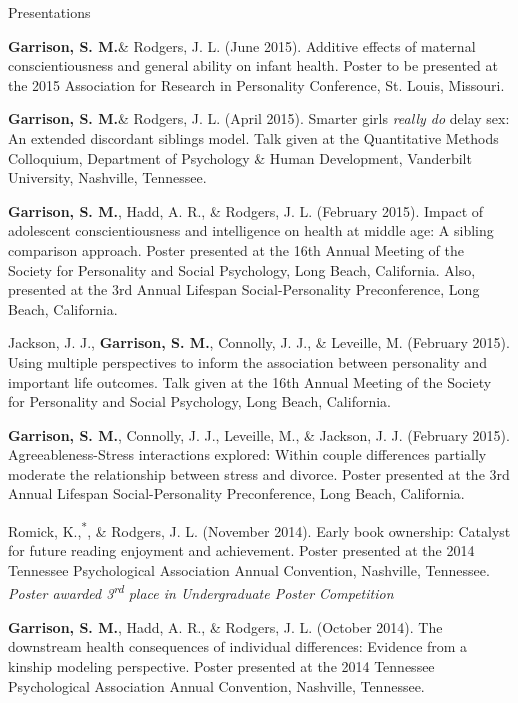 \documentclass {resume}
\newcommand{\meb}{{\bf Garrison, S. M.}\xspace}
\newcommand{\student}{\hspace{-3.95pt}\textsuperscript{*}\hspace* {2 pt}}
\newlength{\wideitemsep}
\let\olditem\item
\renewcommand{\item}{\setlength{\itemsep}{\wideitemsep}\olditem}
\begin{document}
\begin{rSection}{\textrm{Presentations}}\begin{etaremune}
\item \meb \& Rodgers, J. L. (June 2015). Additive effects of maternal conscientiousness and general ability on infant health. Poster to be presented at the 2015 Association for Research in Personality Conference, St. Louis, Missouri.%
\item\meb \& Rodgers, J. L. (April 2015). Smarter girls \textit{really do} delay sex: An extended discordant siblings model. Talk given at the Quantitative Methods Colloquium, Department of Psychology \& Human Development, Vanderbilt University, Nashville, Tennessee.
\item \meb, Hadd, A. R., \& Rodgers, J. L. (February 2015). Impact of adolescent conscientiousness and intelligence on health at middle age: A sibling comparison approach. Poster presented at the 16th Annual Meeting of the Society for Personality and  Social Psychology, Long Beach, California. Also, presented at the 3rd Annual Lifespan Social-Personality Preconference, Long Beach, California.
\item Jackson, J. J., \textbf{Garrison, S. M.}, Connolly, J. J., \& Leveille, M. (February 2015). Using multiple perspectives to inform the association between personality and important life outcomes. Talk given at the 16th Annual Meeting of the Society for Personality and  Social Psychology, Long Beach, California.
\item\meb, Connolly, J. J., Leveille, M., \& Jackson, J. J. (February 2015). Agreeableness-Stress interactions explored: Within couple differences partially moderate the relationship between stress and divorce. Poster presented at the 3rd Annual Lifespan Social-Personality Preconference, Long Beach, California.
\item Romick, K.,\student \meb, \& Rodgers, J. L. (November 2014). Early book ownership: Catalyst for future reading enjoyment and achievement. Poster presented at the 2014 Tennessee Psychological Association Annual Convention, Nashville, Tennessee. \textit{Poster awarded 3\textsuperscript{rd} place in Undergraduate Poster Competition}
\item\meb, Hadd, A. R., \& Rodgers, J. L. (October 2014). The downstream health consequences of individual differences: Evidence from a kinship modeling perspective. Poster presented at the 2014 Tennessee Psychological Association Annual Convention, Nashville, Tennessee.

\end{etaremune}
\end{rSection}
\end{document}
